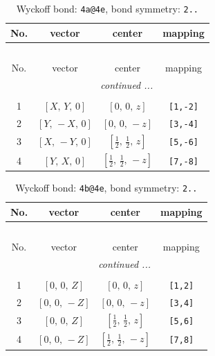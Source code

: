 \documentclass[fleqn,8pt]{jsarticle}
\begin{document}
\begin{longtable}{cccc}
\caption{Wyckoff bond: {\tt 4a@4e}, bond symmetry: {\tt 2..}}
 \\
 \hline \hline
No. & vector & center & mapping \\ \hline \endfirsthead

\multicolumn{3}{l}{\tablename\ \thetable{}} \\
 \hline \hline
No. & vector & center & mapping \\ \hline \endhead

 \hline \hline
\multicolumn{3}{r}{\footnotesize\it continued ...} \\ \endfoot

 \hline \hline
\multicolumn{3}{r}{} \\ \endlastfoot

1 & $\left[ X,\, Y,\, 0 \right]$ & $\left[ 0,\, 0,\, z \right]$ & {\tt [1,-2]} \\ \hline
2 & $\left[ Y,\, - X,\, 0 \right]$ & $\left[ 0,\, 0,\, - z \right]$ & {\tt [3,-4]} \\ \hline
3 & $\left[ X,\, - Y,\, 0 \right]$ & $\left[ \frac{1}{2},\, \frac{1}{2},\, z \right]$ & {\tt [5,-6]} \\ \hline
4 & $\left[ Y,\, X,\, 0 \right]$ & $\left[ \frac{1}{2},\, \frac{1}{2},\, - z \right]$ & {\tt [7,-8]} \\
\end{longtable}
\renewcommand{\arraystretch}{1.2}
\begin{longtable}{cccc}
\caption{Wyckoff bond: {\tt 4b@4e}, bond symmetry: {\tt 2..}}
 \\
 \hline \hline
No. & vector & center & mapping \\ \hline \endfirsthead

\multicolumn{3}{l}{\tablename\ \thetable{}} \\
 \hline \hline
No. & vector & center & mapping \\ \hline \endhead

 \hline \hline
\multicolumn{3}{r}{\footnotesize\it continued ...} \\ \endfoot

 \hline \hline
\multicolumn{3}{r}{} \\ \endlastfoot

1 & $\left[ 0,\, 0,\, Z \right]$ & $\left[ 0,\, 0,\, z \right]$ & {\tt [1,2]} \\ \hline
2 & $\left[ 0,\, 0,\, - Z \right]$ & $\left[ 0,\, 0,\, - z \right]$ & {\tt [3,4]} \\ \hline
3 & $\left[ 0,\, 0,\, Z \right]$ & $\left[ \frac{1}{2},\, \frac{1}{2},\, z \right]$ & {\tt [5,6]} \\ \hline
4 & $\left[ 0,\, 0,\, - Z \right]$ & $\left[ \frac{1}{2},\, \frac{1}{2},\, - z \right]$ & {\tt [7,8]} \\
\end{longtable}
\end{document}
